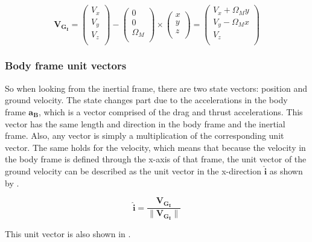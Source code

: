 \begin{equation} \label{eq:VGI}
\mathbf{V_{G_{I}}} = 
\begin{pmatrix}
V_{x}\\
V_{y}\\
V_{z}\\
\end{pmatrix}
-
\begin{pmatrix}
0 \\
0 \\
\Omega_{M} \\
\end{pmatrix}
\times
\begin{pmatrix}
x \\
y \\
z \\
\end{pmatrix}=
\begin{pmatrix}
V_{x}+\Omega_{M}y \\
V_{y}-\Omega_{M}x \\
V_{z} \\
\end{pmatrix}
\end{equation}

\subsubsection{Body frame unit vectors}
So when looking from the inertial frame, there are two state vectors: position and ground velocity. The state changes part due to the accelerations in the body frame $\mathbf{a_{B}}$, which is a vector comprised of the drag and thrust accelerations. This vector has the same length and direction in the body frame and the inertial frame. Also, any vector is simply a multiplication of the corresponding unit vector. The same holds for the velocity, which means that because the velocity in the body frame is defined through the x-axis of that frame, the unit vector of the ground velocity can be described as the unit vector in the x-direction $\mathbf{\hat{i}}$ as shown by .

\begin{equation} \label{eq:iHat}
\mathbf{\hat{i}} = \dfrac{\mathbf{V_{G_{I}}}}{\| \mathbf{V_{G_{I}}}\|}
\end{equation}

This unit vector is also shown in .

